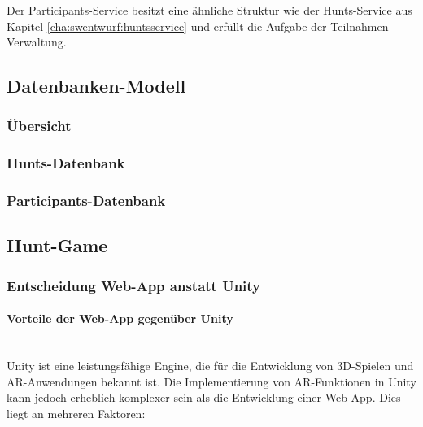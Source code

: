 Der Participants-Service besitzt eine ähnliche Struktur wie der Hunts-Service aus Kapitel \ref{cha:swentwurf:huntsservice} und erfüllt die Aufgabe der Teilnahmen-Verwaltung. 



\subsection{Datenbanken-Modell}

\subsubsection{Übersicht}


\subsubsection{Hunts-Datenbank}


\subsubsection{Participants-Datenbank}


\subsection{Hunt-Game}

\subsubsection{Entscheidung Web-App anstatt Unity}

\paragraph{Vorteile der Web-App gegenüber Unity} \mbox{}\\
Unity ist eine leistungsfähige Engine, die für die Entwicklung von 3D-Spielen und AR-Anwendungen bekannt ist. Die Implementierung von AR-Funktionen in Unity kann jedoch erheblich komplexer sein als die Entwicklung einer Web-App. Dies liegt an mehreren Faktoren:


